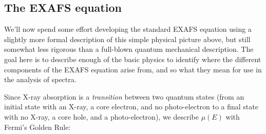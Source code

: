 \subsection{The EXAFS equation}

We'll now spend some effort developing the standard EXAFS equation using a
slightly more formal description of this simple physical picture above, but
still somewhat less rigorous than a full-blown quantum mechanical
description.  The goal here is to describe enough of the basic physics to
identify where the different components of the EXAFS equation arise from,
and so what they mean for use in the analysis of spectra.

Since X-ray absorption is a {\emph{transition}} between two quantum states
(from an initial state with an X-ray, a core electron, and no
photo-electron to a final state with no X-ray, a core hole, and a
photo-electron), we describe $\mu(E)$ with Fermi's Golden Rule:

